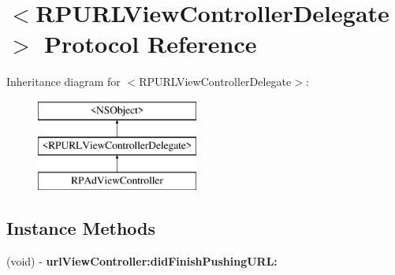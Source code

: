 \hypertarget{protocol_r_p_u_r_l_view_controller_delegate-p}{\section{$<$R\-P\-U\-R\-L\-View\-Controller\-Delegate$>$ Protocol Reference}
\label{protocol_r_p_u_r_l_view_controller_delegate-p}
}
Inheritance diagram for $<$R\-P\-U\-R\-L\-View\-Controller\-Delegate$>$\-:\begin{figure}[H]
\begin{center}
\leavevmode
\includegraphics[height=3.000000cm]{protocol_r_p_u_r_l_view_controller_delegate-p}
\end{center}
\end{figure}
\subsection*{Instance Methods}
\begin{DoxyCompactItemize}
\item 
\hypertarget{protocol_r_p_u_r_l_view_controller_delegate-p_a79a8ecd57fcd08698a40d0701a3da9c8}{(void) -\/ {\bfseries url\-View\-Controller\-:did\-Finish\-Pushing\-U\-R\-L\-:}}\label{protocol_r_p_u_r_l_view_controller_delegate-p_a79a8ecd57fcd08698a40d0701a3da9c8}

\end{DoxyCompactItemize}
